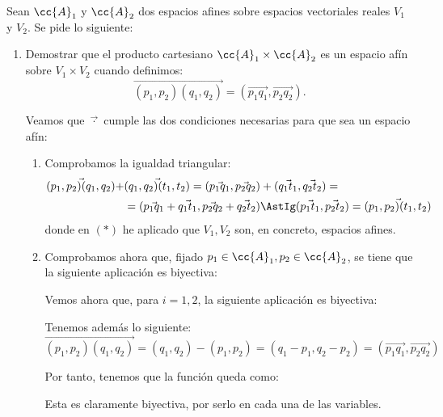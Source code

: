 \begin{ejercicio} Sean $\cc{A}_1$ y $\cc{A}_2$ dos espacios afines sobre espacios vectoriales reales $V_1$ y $V_2$. Se pide lo siguiente:
\begin{enumerate}
    \item Demostrar que el producto cartesiano $\cc{A}_1 \times \cc{A}_2$ es un espacio afín sobre $V_1 \times V_2$ cuando definimos:
    \begin{equation*}
        \vec{(p_1, p_2)(q_1, q_2)} = (\vec{p_1q_1}, \vec{p_2q_2}).
    \end{equation*}

    Veamos que $\vec{\cdot}$ cumple las dos condiciones necesarias para que sea un espacio afín:
    \begin{enumerate}
        \item Comprobamos la igualdad triangular:
        \begin{equation*}\begin{split}
            \vec{(p_1, p_2)(q_1, q_2)} +&\vec{(q_1, q_2)(t_1, t_2)}
            = (\vec{p_1q_1}, \vec{p_2q_2}) + (\vec{q_1t_1}, \vec{q_2t_2}) =\\
            &= (\vec{p_1q_1}+\vec{q_1t_1}, \vec{p_2q_2}+\vec{q_2t_2})
            \AstIg (\vec{p_1t_1}, \vec{p_2t_2}) = \vec{(p_1, p_2)(t_1, t_2)}
        \end{split}\end{equation*}
        donde en $(\ast)$ he aplicado que $V_1,V_2$ son, en concreto, espacios afines.

        \item Comprobamos ahora que, fijado $p_1\in \cc{A}_1,p_2\in \cc{A}_2$, se tiene que la siguiente aplicación es biyectiva:

        Vemos ahora que, para $i=1,2$, la siguiente aplicación es biyectiva:
        
        Tenemos además lo siguiente:
        $$\vec{(p_1, p_2)(q_1, q_2)}=(q_1,q_2) - (p_1,p_2)=(q_1-p_1,q_2-p_2) = \left(\vec{p_1q_1},\vec{p_2q_2}\right)$$

        Por tanto, tenemos que la función queda como:

        Esta es claramente biyectiva, por serlo en cada una de las variables.
    \end{enumerate}
    

\end{enumerate}
\end{ejercicio}
